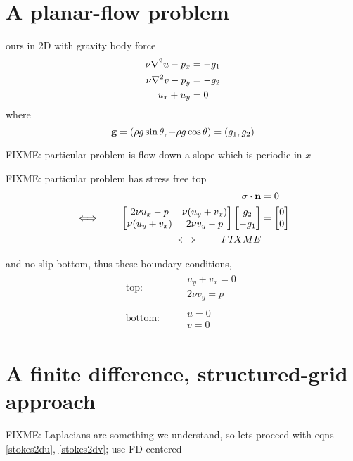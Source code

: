\section{A planar-flow problem}

ours in 2D with gravity body force
\begin{align}
\nu \nabla^2 u - p_x &= - g_1 \label{stokes2du} \\
\nu \nabla^2 v - p_y &= - g_2 \label{stokes2dv} \\
u_x + u_y &= 0 \label{stokes2dincomp} 
\end{align}
where
    $$\mathbf{g} = (\rho g \sin \theta, - \rho g \cos \theta) = (g_1,g_2)$$

FIXME: particular problem is flow down a slope which is periodic in $x$

FIXME: particular problem has stress free top
\begin{align*}
\sigma\cdot\mathbf{n} &= 0 \\
\iff \qquad \begin{bmatrix}
2 \nu u_x - p & \nu (u_y+v_x) \\
\nu (u_y+v_x) & 2 \nu v_y - p
\end{bmatrix} \begin{bmatrix}
g_2 \\ -g_1
\end{bmatrix} &= \begin{bmatrix}
0 \\ 0
\end{bmatrix} \\
\iff \qquad FIXME
\end{align*}

and no-slip bottom, thus these boundary conditions,
\begin{align}
\text{top:}&    & &\begin{array}{l} u_y + v_x = 0 \\ 2 \nu v_y = p\end{array} \\
\text{bottom:}& & &\begin{array}{l} u = 0 \\ v = 0 \end{array}
\end{align}

\section{A finite difference, structured-grid approach}

FIXME: Laplacians are something we understand, so lets proceed with eqns \eqref{stokes2du}, \eqref{stokes2dv}; use FD centered

